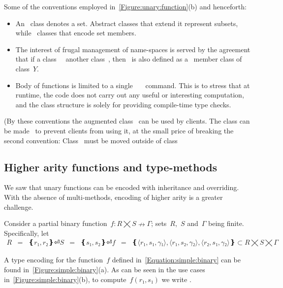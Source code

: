 Some of the conventions employed in~\cref{Figure:unary:function}(b) and henceforth:
\begin{itemize}
  \item An~ class denotes a set. Abstract classes that extend it represent
      subsets, while~ classes that encode set members.
  \item The interest of frugal management of name-spaces is served by the agreement that if
    a class~~ another class~, then~ is also defined
    as a~ member class of class~$Y$.
  \item Body of functions is limited to a single~~~\cc{;} command.
    This is to stress that at runtime, the code does not carry out any useful or interesting computation,
      and the class structure is solely for providing compile-time type checks.
\end{itemize}
(By these conventions the augmented class~ can be used by clients.
The class can be made~ to prevent clients from using it,
  at the small price of breaking the second convention:
  Class~ must be moved outside of class~

\subsection{Higher arity functions and type-methods}\label{Subsection:arity}
We saw that unary functions can be encoded with inheritance and overriding.
With the absence of multi-methods, encoding of higher arity is a greater challenge.

Consider a partial binary function~$f: R⨉S↛Γ$; sets~$R$,~$S$ and~$Γ$ being finite.
Specifically, let
\begin{equation}
  \label{Equation:simple:binary}
  \begin{array}{rlc}
    R & = & ❴ r₁, r₂❵⏎
    S & = & ❴ s₁, s₂❵⏎
    f & = & ❴ ⟨r₁, s₁,γ₁⟩, ⟨r₁, s₂,γ₂⟩, ⟨r₂, s₁,γ₂⟩ ❵ ⊂ R⨉S⨉Γ
  \end{array}
\end{equation}

A \Java type encoding for the function~$f$ defined in~\cref{Equation:simple:binary}
  can be found in~\cref{Figure:simple:binary}(a).
As can be seen in the use cases in~\cref{Figure:simple:binary}(b),
  to compute~$f(r₁,s₁)$ we write .

